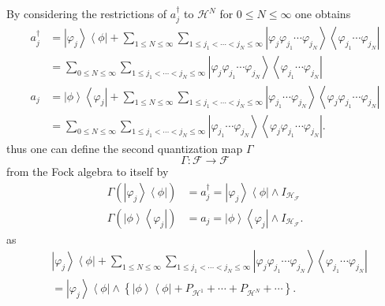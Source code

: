 \documentclass[aps,preprint]{revtex4}%
\begin{document}
\bigskip By considering the restrictions of $a_{j}^{\dagger}$ to
$\mathcal{H}^{N}$ for $0\leq N\leq\infty$ one obtains%
\begin{align}
a_{j}^{\dagger}  &  =\left\vert \varphi_{j}\right\rangle \left\langle
\phi\right\vert +\sum_{1\leq N\leq\infty}\sum_{1\leq j_{1}<\cdots<j_{N}%
\leq\infty}\left\vert \varphi_{j}\varphi_{j_{1}}\cdots\varphi_{j_{N}%
}\right\rangle \left\langle \varphi_{j_{1}}\cdots\varphi_{j_{N}}\right\vert
\nonumber\\
&  =\sum_{0\leq N\leq\infty}\sum_{1\leq j_{1}<\cdots<j_{N}\leq\infty
}\left\vert \varphi_{j}\varphi_{j_{1}}\cdots\varphi_{j_{N}}\right\rangle
\left\langle \varphi_{j_{1}}\cdots\varphi_{j_{N}}\right\vert \nonumber\\
a_{j}  &  =\left\vert \phi\right\rangle \left\langle \varphi_{j}\right\vert
+\sum_{1\leq N\leq\infty}\sum_{1\leq j_{1}<\cdots<j_{N}\leq\infty}\left\vert
\varphi_{j_{1}}\cdots\varphi_{j_{N}}\right\rangle \left\langle \varphi
_{j}\varphi_{j_{1}}\cdots\varphi_{j_{N}}\right\vert \nonumber\\
&  =\sum_{0\leq N\leq\infty}\sum_{1\leq j_{1}<\cdots<j_{N}\leq\infty
}\left\vert \varphi_{j_{1}}\cdots\varphi_{j_{N}}\right\rangle \left\langle
\varphi_{j}\varphi_{j_{1}}\cdots\varphi_{j_{N}}\right\vert . \label{FQ1}%
\end{align}
thus one can define the second quantization map $\Gamma$
\begin{equation}
\Gamma:\mathcal{F\rightarrow F}%
\end{equation}
from the Fock algebra to itself by
\begin{align}
\Gamma\left(  \left\vert \varphi_{j}\right\rangle \left\langle \phi\right\vert
\right)   &  =a_{j}^{\dagger}=\left\vert \varphi_{j}\right\rangle \left\langle
\phi\right\vert \wedge I_{\mathcal{H}_{\mathcal{F}}}\nonumber\\
\Gamma\left(  \left\vert \phi\right\rangle \left\langle \varphi_{j}\right\vert
\right)   &  =a_{j}=\left\vert \phi\right\rangle \left\langle \varphi
_{j}\right\vert \wedge I_{\mathcal{H}_{\mathcal{F}}}.
\end{align}
as
\begin{align}
&  \left\vert \varphi_{j}\right\rangle \left\langle \phi\right\vert
+\sum_{1\leq N\leq\infty}\sum_{1\leq j_{1}<\cdots<j_{N}\leq\infty}\left\vert
\varphi_{j}\varphi_{j_{1}}\cdots\varphi_{j_{N}}\right\rangle \left\langle
\varphi_{j_{1}}\cdots\varphi_{j_{N}}\right\vert \nonumber\\
&  =\left\vert \varphi_{j}\right\rangle \left\langle \phi\right\vert
\wedge\left\{  \left\vert \phi\right\rangle \left\langle \phi\right\vert
+P_{\mathcal{H}^{1}}+\cdots+P_{\mathcal{H}^{N}}+\cdots\right\}  .
\end{align}
\end{document}
